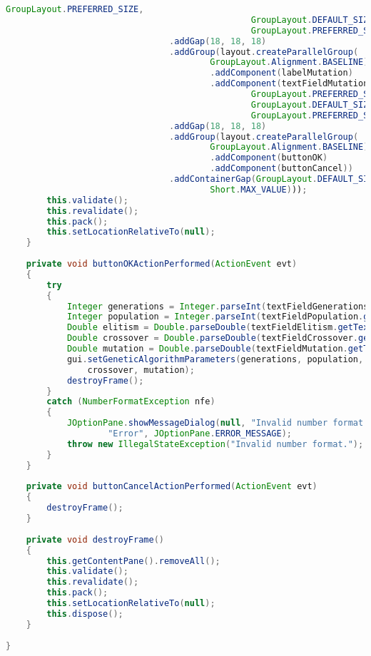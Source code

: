\begin{lstlisting}[language=Java,basicstyle=\tiny,caption=GeneticParameters.java]
                                                GroupLayout.PREFERRED_SIZE,
                                                GroupLayout.DEFAULT_SIZE,
                                                GroupLayout.PREFERRED_SIZE))
                                .addGap(18, 18, 18)
                                .addGroup(layout.createParallelGroup(
                                        GroupLayout.Alignment.BASELINE)
                                        .addComponent(labelMutation)
                                        .addComponent(textFieldMutation,
                                                GroupLayout.PREFERRED_SIZE,
                                                GroupLayout.DEFAULT_SIZE,
                                                GroupLayout.PREFERRED_SIZE))
                                .addGap(18, 18, 18)
                                .addGroup(layout.createParallelGroup(
                                        GroupLayout.Alignment.BASELINE)
                                        .addComponent(buttonOK)
                                        .addComponent(buttonCancel))
                                .addContainerGap(GroupLayout.DEFAULT_SIZE,
                                        Short.MAX_VALUE)));
        this.validate();
        this.revalidate();
        this.pack();
        this.setLocationRelativeTo(null);
    }
    
    private void buttonOKActionPerformed(ActionEvent evt)
    {
        try
        {
            Integer generations = Integer.parseInt(textFieldGenerations.getText());
            Integer population = Integer.parseInt(textFieldPopulation.getText());
            Double elitism = Double.parseDouble(textFieldElitism.getText());
            Double crossover = Double.parseDouble(textFieldCrossover.getText());
            Double mutation = Double.parseDouble(textFieldMutation.getText());
            gui.setGeneticAlgorithmParameters(generations, population, elitism, 
                crossover, mutation);
            destroyFrame();
        }
        catch (NumberFormatException nfe)
        {
            JOptionPane.showMessageDialog(null, "Invalid number format.",
                    "Error", JOptionPane.ERROR_MESSAGE);
            throw new IllegalStateException("Invalid number format.");
        }
    }
    
    private void buttonCancelActionPerformed(ActionEvent evt)
    {
        destroyFrame();
    }
    
    private void destroyFrame()
    {
        this.getContentPane().removeAll();
        this.validate();
        this.revalidate();
        this.pack();
        this.setLocationRelativeTo(null);
        this.dispose();
    }
    
}
\end{lstlisting}